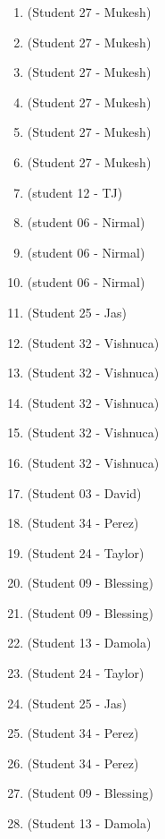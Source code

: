 \begin{enumerate}[label=\#\arabic*]
\item \cite{hurlbert1997higher}(Student 27 - Mukesh)
\item \cite{muller2021paper}(Student 27 - Mukesh)
\item \cite{roig2024arithmetic}(Student 27 - Mukesh)
\item \cite{stelldinger2024puzzleboard}(Student 27 - Mukesh)
\item \cite{hsieh2002bruijn}(Student 27 - Mukesh)
\item \cite{roig2022bruijn}(Student 27 - Mukesh)
\item \cite{becher2023nested} (student 12 - TJ)
\item \cite{grubman2016partitioning} (student 06 - Nirmal)
\item \cite{hales2009directed} (student 06 - Nirmal)
\item \cite{muggli2017succinct} (student 06 - Nirmal)
\item \cite{horan2016locating} (Student 25 - Jas)
\item \cite{clapham1986universal} (Student 32 - Vishnuca)
\item \cite{kim2008aperiodic} (Student 32 - Vishnuca)
\item \cite{van1979pseudo} (Student 32 - Vishnuca)
\item \cite{chee2025constructions} (Student 32 - Vishnuca)
\item \cite{calabro1967synthesis} (Student 32 - Vishnuca)
\item \cite{reed1962note} (Student 03 - David) 
\item \cite{hurlbert1994meshing} (Student 34 - Perez)
\item \cite{costa2019tour} (Student 24 - Taylor)
\item \cite{paterson1994perfect} (Student 09 - Blessing)
\item \cite{ulusoy2009one} (Student 09 - Blessing)
\item \cite{szentandrasi2012uniform} (Student 13 - Damola)
\item \cite{carey2025universal} (Student 24 - Taylor)
\item \cite{mitchell1995aperiodic} (Student 25 - Jas)
\item \cite{roig2021review} (Student 34 - Perez)
\item \cite{isaak1993bruijn} (Student 34 - Perez)
\item \cite{fredricksen1992new} (Student 09 - Blessing)
\item \cite{bruckstein2012simple} (Student 13 - Damola)

\end{enumerate}
